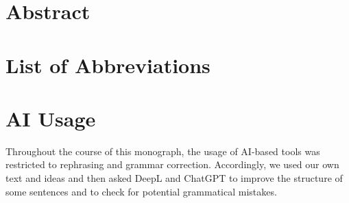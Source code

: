\documentclass[a4paper, 11pt, twoside]{article}
\begin{document}
\setcounter{page}{2}

\section*{Abstract}

\paragraph{}

\pagebreak

\tableofcontents


\newpage


\listoffigures

\newpage
\section*{List of Abbreviations}
\paragraph{}

\newpage










\section{AI Usage}
Throughout the course of this monograph, the usage of AI-based tools was restricted to rephrasing and grammar correction. Accordingly, we used our own text and ideas and then asked DeepL and ChatGPT to improve the structure of some sentences and to check for potential grammatical mistakes. 
\newpage

\nocite{*}
\printbibliography
\end{document}
